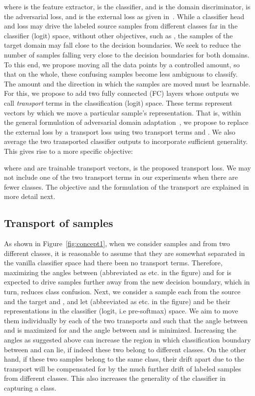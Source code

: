 \documentclass[10pt,twocolumn,letterpaper]{article}
\begin{document}
where  is the feature extractor,  is the classifier, and  is the domain discriminator,  is the adversarial loss, and  is the external loss as given in~\cite{adda}. While a classifier head and loss may drive the labeled source samples from different classes far in the classifier (logit) space, without other objectives, such as , the samples of the target domain may fall close to the decision boundaries. We seek to reduce the number of samples falling very close to the decision boundaries for both domains. To this end, we propose moving all the data points by a controlled amount, so that on the whole, these confusing samples become less ambiguous to classify. The amount and the direction in which the samples are moved must be learnable. For this, we propose to add two fully connected (FC) layers whose outputs we call \emph{transport} terms in the classification (logit) space. These terms represent vectors by which we move a particular sample's representation. That is, within the general formulation of adversarial domain adaptation~\cite{adda}, we propose to replace the external loss by a transport loss using two transport terms  and . We also average the two transported classifier outputs to incorporate sufficient generality. This gives rise to a more specific objective:





where  and  are trainable transport vectors,  is the proposed transport loss. We may not include one of the two transport terms in our experiments when there are fewer classes. The objective and the formulation of the transport are explained in more detail next. 


\subsection{Transport of samples}

As shown in Figure~\ref{fig:concept1}, when we consider samples   and  from two different classes, it is reasonable to assume that they are somewhat separated in the vanilla classifier space had there been no transport terms. Therefore, maximizing the angles between  (abbreviated as  etc. in the figure) and  for  is expected to drive samples further away from the new decision boundary, which in turn, reduces class confusion. Next, we consider a sample each from the source and the target  and , and let  (abbreviated as  etc. in the figure) and  be their representations in the classifier (logit, i.e pre-softmax) space. We aim to move them individually by each of the two transports  and  such that the angle between  and  is maximized for  and the angle between  and  is minimized. Increasing the angles as suggested above can increase the region in which classification boundary between  and  can lie, if indeed these two belong to different classes. On the other hand, if these two samples belong to the same class, their drift apart due to the transport will be compensated for by the much further drift of labeled samples from different classes. This also increases the generality of the classifier in capturing a class.
\end{document}
